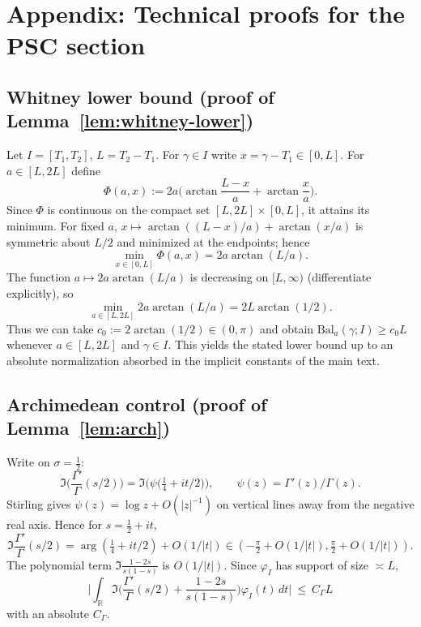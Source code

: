 \documentclass[11pt]{article}
\theoremstyle{definition}
\theoremstyle{remark}
\newcommand{\R}{\mathbb{R}}
\begin{document}
\appendix
\section{Appendix: Technical proofs for the PSC section}\label{app:psc-tech}
\subsection{Whitney lower bound (proof of Lemma~\ref{lem:whitney-lower})}
Let \(I=[T_1,T_2]\), \(L=T_2-T_1\). For \(\gamma\in I\) write \(x=\gamma-T_1\in[0,L]\). For \(a\in[L,2L]\) define
\[\Phi(a,x):=2a\Big(\arctan\frac{L-x}{a}+\arctan\frac{x}{a}\Big).\]
Since \(\Phi\) is continuous on the compact set \([L,2L]\times[0,L]\), it attains its minimum. For fixed \(a\), \(x\mapsto\arctan((L-x)/a)+\arctan(x/a)\) is symmetric about \(L/2\) and minimized at the endpoints; hence
\[\min_{x\in[0,L]}\Phi(a,x)=2a\arctan(L/a).\]
The function \(a\mapsto 2a\arctan(L/a)\) is decreasing on \([L,\infty)\) (differentiate explicitly), so
\[\min_{a\in[L,2L]}2a\arctan(L/a)=2L\arctan(1/2).\]
Thus we can take \(c_0:=2\arctan(1/2)\in(0,\pi)\) and obtain \(\mathrm{Bal}_a(\gamma;I)\ge c_0 L\) whenever \(a\in[L,2L]\) and \(\gamma\in I\). This yields the stated lower bound up to an absolute normalization absorbed in the implicit constants of the main text.

\subsection{Archimedean control (proof of Lemma~\ref{lem:arch})}
Write on \(\sigma=\tfrac12\):
\[\Im\Big(\frac{\Gamma'}{\Gamma}(s/2)\Big)=\Im\Big(\psi\big(\tfrac14+it/2\big)\Big),\qquad \psi(z)=\Gamma'(z)/\Gamma(z).\]
Stirling gives \(\psi(z)=\log z+O(|z|^{-1})\) on vertical lines away from the negative real axis. Hence for \(s=\tfrac12+it\),
\[\Im\frac{\Gamma'}{\Gamma}(s/2)=\arg(\tfrac14+it/2)+O(1/|t|)\in(-\tfrac{\pi}{2}+O(1/|t|),\tfrac{\pi}{2}+O(1/|t|)).\]
The polynomial term \(\Im\frac{1-2s}{s(1-s)}\) is \(O(1/|t|)\). Since \(\varphi_I\) has support of size \(\asymp L\),
\[\Big|\int_{\R}\Im\Big(\frac{\Gamma'}{\Gamma}(s/2)+\frac{1-2s}{s(1-s)}\Big)\varphi_I(t)\,dt\Big|\ \le\ C_\Gamma L\]
with an absolute \(C_\Gamma\).
\end{document}
